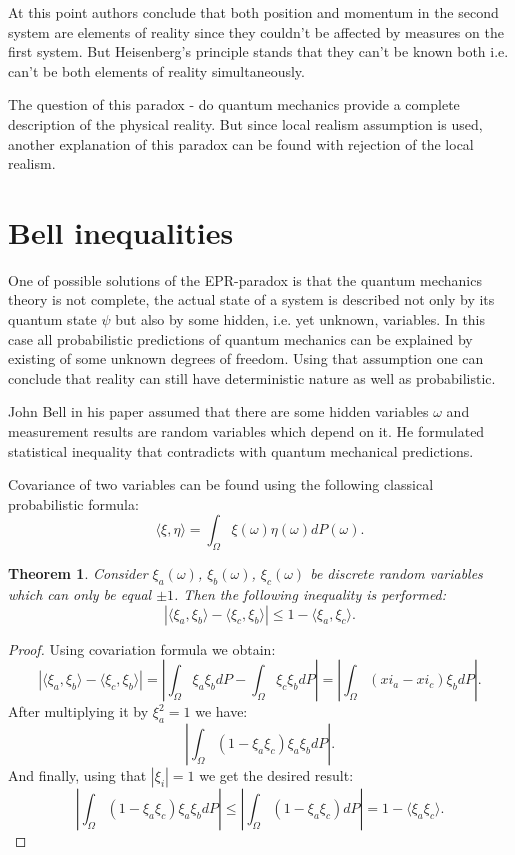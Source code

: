 \documentclass[11pt]{article}
\newtheorem{theorem}{Theorem}[section]
\begin{document}
At this point authors conclude that both position and momentum in the second system are elements of reality since they couldn't be affected by measures on the first system. But Heisenberg's principle stands that they can't be known both i.e. can't be both elements of reality simultaneously. 

The question of this paradox - do quantum mechanics provide a complete description of the physical reality. But since local realism assumption is used, another explanation of this paradox can be found with rejection of the local realism.

\section{Bell inequalities}
One of possible solutions of the EPR-paradox is that the quantum mechanics theory is not complete, the actual state of a system is described not only by its quantum state $\psi$ but also by some hidden, i.e. yet unknown, variables. In this case all probabilistic predictions of quantum mechanics can be explained by existing of some unknown degrees of freedom. Using that assumption one can conclude that reality can still have deterministic nature as well as probabilistic.

John Bell in his paper \cite{Bell} assumed that there are some hidden variables $\omega$ and measurement results are random variables which depend on it. He formulated statistical inequality that contradicts with quantum mechanical predictions.

Covariance of two variables can be found using the following classical probabilistic formula:
\[
\langle \xi, \eta \rangle = \int_\Omega \xi(\omega)\eta(\omega)dP(\omega).
\]

\begin{theorem}
Consider $\xi_a(\omega)$, $\xi_b(\omega)$, $\xi_c(\omega)$ be discrete random variables which can only be equal $\pm 1$. Then the following inequality is performed:
\[
| \langle\xi_a,\xi_b\rangle -  \langle\xi_c,\xi_b\rangle | \leq 1 - \langle\xi_a,\xi_c\rangle.
\]
\end{theorem}

\begin{proof}
Using covariation formula we obtain:
\[
| \langle\xi_a,\xi_b\rangle -  \langle\xi_c,\xi_b\rangle | = \left| \int_\Omega\xi_a\xi_b dP - \int_\Omega\xi_c\xi_b dP\right| = \left|\int_\Omega (xi_a - xi_c)\xi_bdP \right|.
\]
After multiplying it by $\xi_a^2 = 1$ we have:
\[
\left|\int_\Omega (1 - \xi_a\xi_c)\xi_a\xi_bdP \right|.
\]
And finally, using that $|\xi_i| = 1$ we get the desired result:
\[
\left|\int_\Omega (1 - \xi_a\xi_c)\xi_a\xi_bdP \right| \leq  \left|\int_\Omega (1 - \xi_a\xi_c)dP\right| = 1 - \langle \xi_a\xi_c\rangle.
\]
\end{proof}
\end{document}
